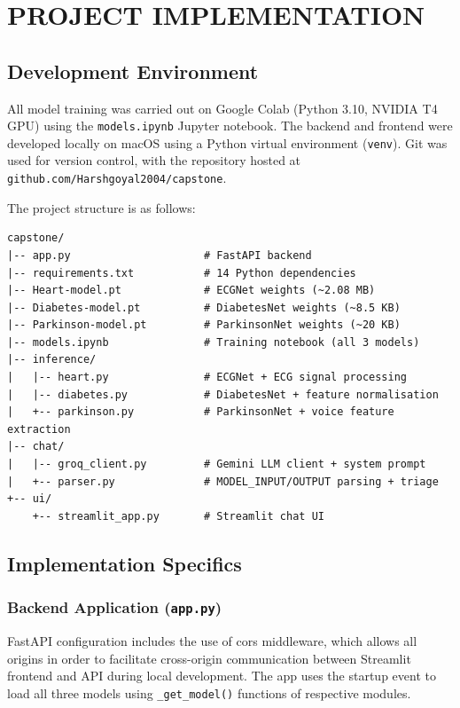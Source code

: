 \chapter{\MakeUppercase{Project Implementation}}
\justifying

\section{Development Environment}

All model training was carried out on Google Colab (Python 3.10, NVIDIA T4 GPU) using the \texttt{models.ipynb} Jupyter notebook. The backend and frontend were developed locally on macOS using a Python virtual environment (\texttt{venv}). Git was used for version control, with the repository hosted at \texttt{github.com/Harshgoyal2004/capstone}.

The project structure is as follows:
\begin{verbatim}
capstone/
|-- app.py                     # FastAPI backend
|-- requirements.txt           # 14 Python dependencies
|-- Heart-model.pt             # ECGNet weights (~2.08 MB)
|-- Diabetes-model.pt          # DiabetesNet weights (~8.5 KB)
|-- Parkinson-model.pt         # ParkinsonNet weights (~20 KB)
|-- models.ipynb               # Training notebook (all 3 models)
|-- inference/
|   |-- heart.py               # ECGNet + ECG signal processing
|   |-- diabetes.py            # DiabetesNet + feature normalisation
|   +-- parkinson.py           # ParkinsonNet + voice feature extraction
|-- chat/
|   |-- groq_client.py         # Gemini LLM client + system prompt
|   +-- parser.py              # MODEL_INPUT/OUTPUT parsing + triage
+-- ui/
    +-- streamlit_app.py       # Streamlit chat UI
\end{verbatim}

\section{Implementation Specifics}

\subsection{Backend Application (\texttt{app.py})}

FastAPI configuration includes the use of \ac{cors} middleware, which allows all origins in order to facilitate cross-origin communication between Streamlit frontend and API during local development. The app uses the startup event to load all three models using \texttt{\_get\_model()} functions of respective modules.

